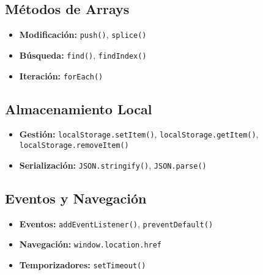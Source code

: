 \documentclass[12pt,a4paper]{article}
\begin{document}
\subsection{Métodos de Arrays}
\begin{itemize}
\item \textbf{Modificación:} \texttt{push()}, \texttt{splice()}
\item \textbf{Búsqueda:} \texttt{find()}, \texttt{findIndex()}
\item \textbf{Iteración:} \texttt{forEach()}
\end{itemize}

\subsection{Almacenamiento Local}
\begin{itemize}
\item \textbf{Gestión:} \texttt{localStorage.setItem()}, \texttt{localStorage.getItem()}, \texttt{localStorage.removeItem()}
\item \textbf{Serialización:} \texttt{JSON.stringify()}, \texttt{JSON.parse()}
\end{itemize}

\subsection{Eventos y Navegación}
\begin{itemize}
\item \textbf{Eventos:} \texttt{addEventListener()}, \texttt{preventDefault()}
\item \textbf{Navegación:} \texttt{window.location.href}
\item \textbf{Temporizadores:} \texttt{setTimeout()}
\end{itemize}
\end{document}

